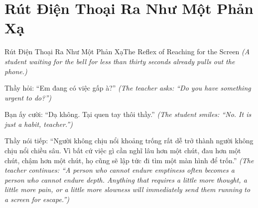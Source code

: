 \section{Rút Điện Thoại Ra Như Một Phản Xạ}
\begin{truyen}{Rút Điện Thoại Ra Như Một Phản Xạ}{The Reflex of Reaching for the Screen}
\textit{(A student waiting for the bell for less than thirty seconds already pulls out the phone.)}

Thầy hỏi: ``Em đang có việc gấp à?''
\textit{(The teacher asks: ``Do you have something urgent to do?'')}

Bạn ấy cười: ``Dạ không. Tại quen tay thôi thầy.''
\textit{(The student smiles: ``No. It is just a habit, teacher.'')}


Thầy nói tiếp: ``Người không chịu nổi khoảng trống rất dễ trở thành người không chịu nổi chiều sâu. Vì bất cứ việc gì cần nghĩ lâu hơn một chút, đau hơn một chút, chậm hơn một chút, họ cũng sẽ lập tức đi tìm một màn hình để trốn.''
\textit{(The teacher continues: ``A person who cannot endure emptiness often becomes a person who cannot endure depth. Anything that requires a little more thought, a little more pain, or a little more slowness will immediately send them running to a screen for escape.'')}
\end{truyen}

